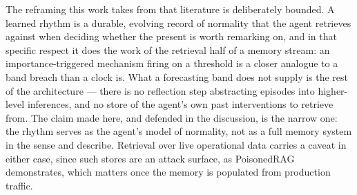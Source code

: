 The reframing this work takes from that literature is deliberately bounded. A
learned rhythm is a durable, evolving record of normality that the agent
retrieves against when deciding whether the present is worth remarking on, and
in that specific respect it does the work of the retrieval half of a memory
stream: an importance-triggered mechanism firing on a threshold is a closer
analogue to a band breach than a clock is. What a forecasting band does not
supply is the rest of the architecture --- there is no reflection step
abstracting episodes into higher-level inferences, and no store of the agent's
own past interventions to retrieve from. The claim made here, and defended in
the discussion, is the narrow one: the rhythm serves as the agent's model of
normality, not as a full memory system in the sense \citet{hu_memory_2026} and
\citet{park_generative_2023} describe. Retrieval over live operational data
carries a caveat in either case, since such stores are an attack surface, as
PoisonedRAG \citep{zou_poisonedrag_2025} demonstrates, which matters once the
memory is populated from production traffic.

